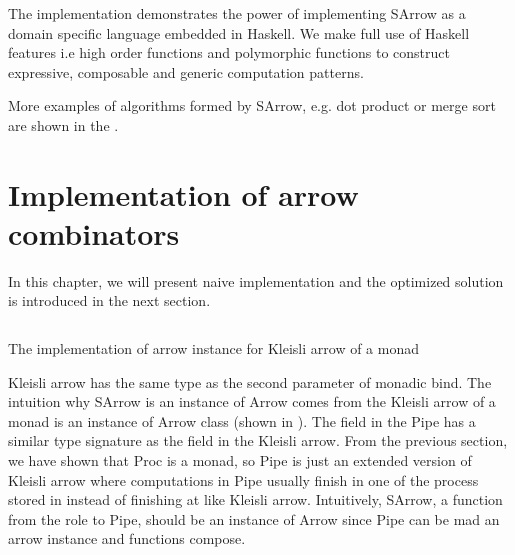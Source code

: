 The implementation demonstrates the power of implementing SArrow as a domain specific language embedded in Haskell. We make full use of Haskell features i.e high order functions and polymorphic functions to construct expressive, composable and \linebreak generic computation patterns.

More examples of algorithms formed by SArrow, e.g. dot product or merge sort are shown in the .
\section{Implementation of arrow combinators} \label{SArrow:impl}
In this chapter, we will present naive implementation and the optimized solution is introduced in the next section.

\begin{listing}[ht]
    \inputminted{Haskell}{arrow/kleisli.hs} 
    \caption{The implementation of arrow instance for Kleisli arrow of a monad}
    \label{arrow:code:kleisli}
\end{listing}

Kleisli arrow has the same type as the second parameter of monadic bind. The intuition why SArrow is an instance of Arrow comes from the Kleisli arrow of a monad is an instance of Arrow class (shown in ). The  field in the Pipe has a similar type signature as the  field in the Kleisli arrow. From the previous section, we have shown that Proc is a monad, so Pipe is just an extended version of Kleisli arrow where computations in Pipe usually finish in one of the process stored in  instead of finishing at  like Kleisli arrow. Intuitively, SArrow, a function from the role to Pipe, should be an instance of Arrow since Pipe can be mad an arrow instance and functions compose.

